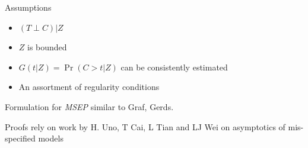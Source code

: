 \documentclass[11pt]{beamer}
\begin{document}
\begin{frame}{Assumptions}

\begin{itemize}
  
  \item  $(T \perp C) | Z$

  \item $Z$ is bounded

  \item $G(t | Z) = \Pr (C > t | Z)$ can be consistently estimated

  \item An assortment of regularity conditions

\end{itemize}

\vspace{0.20in}
Formulation for \textsl{MSEP} similar to Graf, Gerds.

\vspace{0.20in}

Proofs rely on work by H. Uno, T Cai, L Tian and LJ Wei on
asymptotics of mis-specified models

\end{frame}
\end{document}
